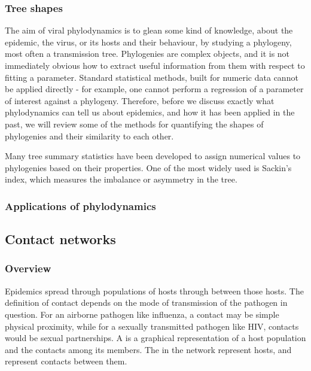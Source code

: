 \subsubsection{Tree shapes}
\label{subsubsec:treeshape}

The aim of viral phylodynamics is to glean some kind of knowledge, about the
epidemic, the virus, or its hosts and their behaviour, by studying a phylogeny,
most often a transmission tree. Phylogenies are complex objects, and it is not
immediately obvious how to extract useful information from them with respect to
fitting a parameter. Standard statistical methods, built for numeric data
cannot be applied directly - for example, one cannot perform a regression of a
parameter of interest against a phylogeny. Therefore, before we discuss exactly
what phylodynamics can tell us about epidemics, and how it has been applied in
the past, we will review some of the methods for quantifying the shapes of
phylogenies and their similarity to each other.

Many tree summary statistics have been developed to assign numerical values to
phylogenies based on their properties. One of the most widely used is Sackin's
index, which measures the imbalance or asymmetry in the tree.

\subsubsection{Applications of phylodynamics}
\label{subsubsec:appphylo}

\subsection{Contact networks}
\label{subsec:contactnet}

\subsubsection{Overview}

Epidemics spread through populations of hosts through  between
those hosts. The definition of contact depends on the mode of transmission of
the pathogen in question. For an airborne pathogen like influenza, a contact
may be simple physical proximity, while for a sexually transmitted pathogen
like HIV, contacts would be sexual partnerships. A  is a
graphical representation of a host population and the contacts among its
members. The  in the network represent hosts, and 
represent contacts between them. 

